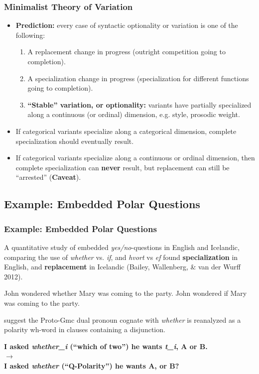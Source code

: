 \documentclass[hyperref={pdfpagelabels=false}]{beamer}
\begin{document}
\begin{frame}
\frametitle{Minimalist Theory of Variation}
\begin{itemize}
	\item \textbf{Prediction:} every case of syntactic optionality or variation is one of the following:
		\begin{enumerate}
			\item A replacement change in progress (outright competition going to completion).
			\item A specialization change in progress (specialization for different functions going to completion).
			\item \textbf{``Stable'' variation, or optionality:} variants have partially specialized along a continuous (or ordinal) dimension, e.g. style, prosodic weight. 
		\end{enumerate}
	\item If categorical variants specialize along a categorical dimension, complete specialization should eventually result.
	\item If categorical variants specialize along a continuous or ordinal dimension, then complete specialization can \textbf{never} result, but replacement can still be ``arrested'' (\textbf{Caveat}).
\end{itemize}

\end{frame}

\subsection{Example: Embedded Polar Questions}

\begin{frame}
\frametitle{Example: Embedded Polar Questions}
A quantitative study of embedded \textsl{yes/no}-questions in English and Icelandic, comparing the use of \textsl{whether} vs. \textsl{if}, and \textsl{hvort} vs \textsl{ef} found \textbf{specialization} in English, and \textbf{replacement} in Icelandic (Bailey, Wallenberg, \& van der Wurff 2012). \nocite{baileywallenbergwurff2012}\\
	\begin{exe}
		\ex John wondered whether Mary was coming to the party.
		\ex John wondered if Mary was coming to the party.
	\end{exe}
\citet{baileywallenbergwurff2012} suggest the Proto-Gmc dual pronoun cognate with \textsl{whether} is reanalyzed as a polarity wh-word in clauses containing a disjunction.
\begin{center}
 \textbf{I asked \textsl{whether_i} (``which of two'') he wants \textsl{t_i}, A or B.} \\$\longrightarrow$ 
 \\ \textbf{I asked \textsl{whether} (``Q-Polarity'') he wants A, or B?}
\end{center}
\end{frame}
\end{document}
